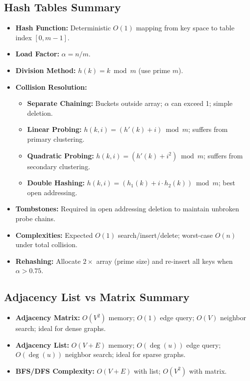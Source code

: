 \subsection{Hash Tables Summary}
\begin{itemize}
    \item \textbf{Hash Function:} Deterministic $O(1)$ mapping from key space to table index $[0, m-1]$.
    \item \textbf{Load Factor:} $\alpha = n / m$.
    \item \textbf{Division Method:} $h(k) = k \bmod m$ (use prime $m$).
    \item \textbf{Collision Resolution:}
    \begin{itemize}
        \item \textbf{Separate Chaining:} Buckets outside array; $\alpha$ can exceed 1; simple deletion.
        \item \textbf{Linear Probing:} $h(k, i) = (h'(k) + i) \bmod m$; suffers from primary clustering.
        \item \textbf{Quadratic Probing:} $h(k, i) = (h'(k) + i^2) \bmod m$; suffers from secondary clustering.
        \item \textbf{Double Hashing:} $h(k, i) = (h_1(k) + i \cdot h_2(k)) \bmod m$; best open addressing.
    \end{itemize}
    \item \textbf{Tombstones:} Required in open addressing deletion to maintain unbroken probe chains.
    \item \textbf{Complexities:} Expected $O(1)$ search/insert/delete; worst-case $O(n)$ under total collision.
    \item \textbf{Rehashing:} Allocate $2\times$ array (prime size) and re-insert all keys when $\alpha > 0.75$.
\end{itemize}

\subsection{Adjacency List vs Matrix Summary}
\begin{itemize}
    \item \textbf{Adjacency Matrix:} $O(V^2)$ memory; $O(1)$ edge query; $O(V)$ neighbor search; ideal for dense graphs.
    \item \textbf{Adjacency List:} $O(V + E)$ memory; $O(\deg(u))$ edge query; $O(\deg(u))$ neighbor search; ideal for sparse graphs.
    \item \textbf{BFS/DFS Complexity:} $O(V + E)$ with list; $O(V^2)$ with matrix.
\end{itemize}

